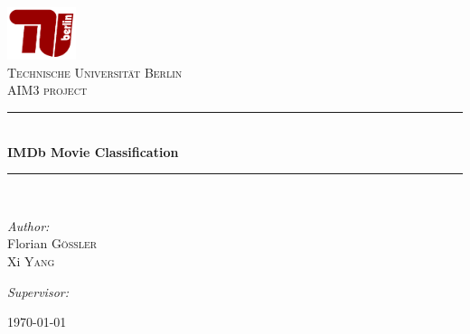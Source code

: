 \documentclass[pdftex,12pt,a4paper]{report}
\newcommand{\HRule}{\rule{\linewidth}{0.5mm}}
\begin{document}
\begin{titlepage} \begin{center}

\includegraphics[width=0.15\textwidth]{logo_tub.png}~\\[1cm]

\textsc{\LARGE Technische Universität Berlin}\\[1.5cm]

\textsc{\Large AIM3 project}\\[0.5cm]

\HRule \\[0.4cm] { \huge \bfseries IMDb Movie Classification \\[0.4cm] }

\HRule \\[1.5cm]

\noindent \begin{minipage}[t]{0.4\textwidth} \begin{flushleft} \large 
\emph{Author:}\\ Florian \textsc{Gößler} \\ Xi \textsc{Yang}\end{flushleft} \end{minipage}
% 
\begin{minipage}[t]{0.4\textwidth} \begin{flushright} \large 
\emph{Supervisor:} \\  \end{flushright} \end{minipage}

\vfill

{\large \today}

\end{center} \end{titlepage}
\end{document}
